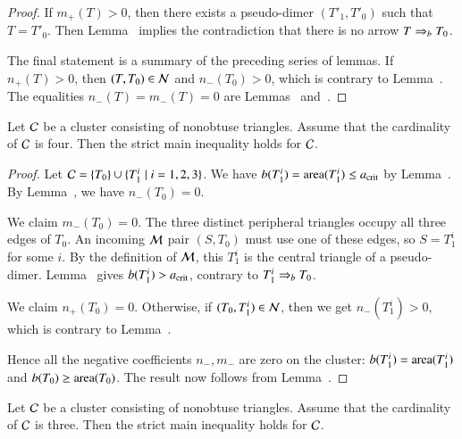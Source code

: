 \begin{proof}
  If $m_+(T)>0$, then there exists a pseudo-dimer $(T'_1,T'_0)$ such
  that $T=T'_0$.  Then Lemma~ implies the
  contradiction that there is no arrow $T\Rightarrow_{b} T_0$.

  The final statement is a summary of the preceding series of lemmas.
   If $n_+(T)>0$, then $(T,T_0)\in\mathcal N$ and $n_-(T_0)>0$, which is contrary
  to Lemma~.    The equalities $n_-(T)=m_-(T)=0$ are
  Lemmas~ and~.
\end{proof}

\begin{lemma}
  Let $\mathcal C$ be a cluster consisting of nonobtuse triangles.  Assume
  that the cardinality of $\mathcal C$ is four.  Then the strict main
  inequality holds for $\mathcal C$.
\end{lemma}

\begin{proof}  
  Let $\mathcal C = \{T_0\}\cup \{T_1^i \mid i=1,2,3\}$.  We have $b(T_1^i) =
  {\operatorname{area}}(T_1^i)\le a_\text{crit}$ by Lemma~.  By
  Lemma~, we have
  $n_-(T_0)=0$.

  We claim $m_-(T_0)=0$.  The three distinct peripheral triangles
  occupy all three edges of $T_0$.  An incoming $\mathcal M$ pair
  $(S,T_0)$ must use one of these edges, so $S=T_1^i$ for some $i$.
  By the definition of $\mathcal M$, this $T_1^i$ is the central triangle
  of a pseudo-dimer.  Lemma~ gives
  $b(T_1^i)>a_\text{crit}$, contrary to $T_1^i\Rightarrow_{b} T_0$.

  We claim $n_+(T_0)=0$.  Otherwise, if $(T_0,T_1^i)\in\mathcal N$, then we
  get $n_-(T_1^i)>0$, which is contrary to Lemma~.

  Hence all the negative coefficients $n_-,m_-$ are zero on the cluster:
  $b(T_1^i)={\operatorname{area}}(T_1^i)$ and $b(T_0) \ge {\operatorname{area}}(T_0)$.  The result now
  follows from Lemma~.
\end{proof}

\begin{lemma}
  Let $\mathcal C$ be a cluster consisting of nonobtuse triangles.  Assume
  that the cardinality of $\mathcal C$ is three.  Then the strict main
  inequality holds for $\mathcal C$.
\end{lemma}

